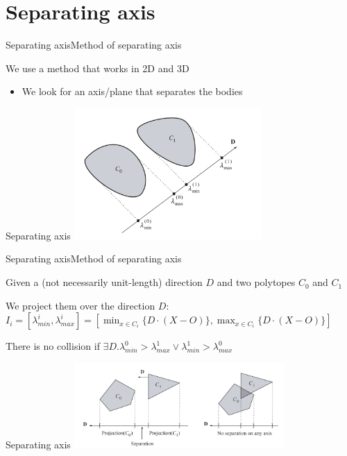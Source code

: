 \documentclass{beamer}
\begin{document}
\section{Separating axis}
\begin{slide}{Separating axis}{Method of separating axis}{
\item We use a method that works in 2D and 3D
\begin{itemize}
\item We look for an axis/plane that separates the bodies
\end{itemize}
}\end{slide}

\begin{frame}{Separating axis}
\center
\includegraphics[height=5cm]{Pics/Fig6_19.png}
\end{frame}

\begin{slide}{Separating axis}{Method of separating axis}{
\item Given a (not necessarily unit-length) direction $D$ and two polytopes $C_0$ and $C_1$
\item We project them over the direction $D$: $I_i = [\lambda_{min}^i,\lambda_{max}^i] = [\min_{x\in C_i}\{ D \cdot (X-O) \}, \max_{x\in C_i}\{ D \cdot (X-O) \}]$
\item There is no collision if $\exists D . \lambda_{min}^0 > \lambda_{max}^1 \vee \lambda_{min}^1 > \lambda_{max}^0$
}\end{slide}

\begin{frame}{Separating axis}
\center
\includegraphics[width=8cm]{Pics/Fig6_20.png}
\end{frame}
\end{document}
